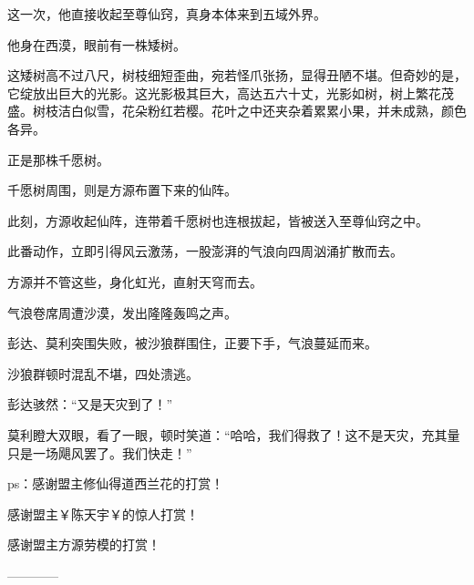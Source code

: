 \begin{this_body}
这一次，他直接收起至尊仙窍，真身本体来到五域外界。

他身在西漠，眼前有一株矮树。

这矮树高不过八尺，树枝细短歪曲，宛若怪爪张扬，显得丑陋不堪。但奇妙的是，它绽放出巨大的光影。这光影极其巨大，高达五六十丈，光影如树，树上繁花茂盛。树枝洁白似雪，花朵粉红若樱。花叶之中还夹杂着累累小果，并未成熟，颜色各异。

正是那株千愿树。

千愿树周围，则是方源布置下来的仙阵。

此刻，方源收起仙阵，连带着千愿树也连根拔起，皆被送入至尊仙窍之中。

此番动作，立即引得风云激荡，一股澎湃的气浪向四周汹涌扩散而去。

方源并不管这些，身化虹光，直射天穹而去。

气浪卷席周遭沙漠，发出隆隆轰鸣之声。

彭达、莫利突围失败，被沙狼群围住，正要下手，气浪蔓延而来。

沙狼群顿时混乱不堪，四处溃逃。

彭达骇然：“又是天灾到了！”

莫利瞪大双眼，看了一眼，顿时笑道：“哈哈，我们得救了！这不是天灾，充其量只是一场飓风罢了。我们快走！”

ps：感谢盟主修仙得道西兰花的打赏！

感谢盟主￥陈天宇￥的惊人打赏！

感谢盟主方源劳模的打赏！

------------

\end{this_body}

